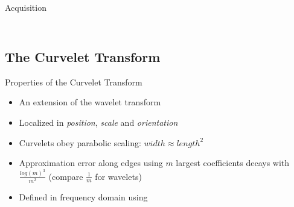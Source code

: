\documentclass[mathserif]{beamer}
\begin{document}
\begin{frame}{Acquisition}
\begin{columns}[T]
\begin{column}{0.5\textwidth}
{            }
        \end{column}
    \end{columns}
\end{frame}

\subsection{The Curvelet Transform}
\begin{frame}{Properties of the Curvelet Transform}
    \begin{itemize}
        \item An extension of the wavelet transform
        \item Localized in \emph{position}, \emph{scale} and \emph{orientation}
        \item Curvelets obey parabolic scaling: $width \approx length^2$
        \item Approximation error along edges using $m$ largest coefficients decays with $\frac{log(m)^3}{m^2}$ (compare $\frac{1}{m}$ for wavelets)
        \item Defined in frequency domain using 
    \end{itemize}
\end{frame}
\end{document}
